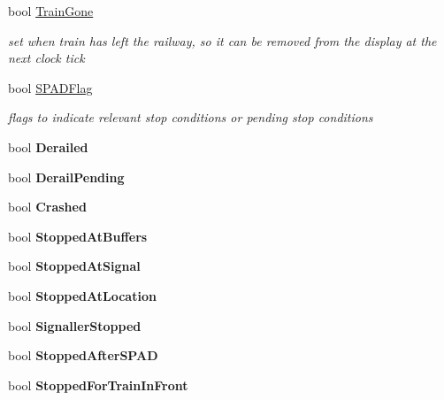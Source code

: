 \begin{DoxyCompactItemize}
bool \mbox{\hyperlink{class_t_train_a3ecf54f0385bc6157ebe5f56512caf1f}{Train\+Gone}}
\begin{DoxyCompactList}\small\item\em set when train has left the railway, so it can be removed from the display at the next clock tick \end{DoxyCompactList}\item 
bool \mbox{\hyperlink{class_t_train_a05383ce005a22df0cb70df7f31a917cf}{S\+P\+A\+D\+Flag}}
\begin{DoxyCompactList}\small\item\em flags to indicate relevant stop conditions or pending stop conditions \end{DoxyCompactList}\item 
\mbox{\label{class_t_train_aa7881a1af2b9f5e899ce02937325c3a3}} 
bool {\bfseries Derailed}
\item 
\mbox{\label{class_t_train_aabb977acb12c9cd6cd527faed9637830}} 
bool {\bfseries Derail\+Pending}
\item 
\mbox{\label{class_t_train_acee5980b53db6ad43e7b5225ad354457}} 
bool {\bfseries Crashed}
\item 
\mbox{\label{class_t_train_a9a549bcd3e8c0d24701399349bc3acc9}} 
bool {\bfseries Stopped\+At\+Buffers}
\item 
\mbox{\label{class_t_train_a444b07eb854c9af80adce5afbb207307}} 
bool {\bfseries Stopped\+At\+Signal}
\item 
\mbox{\label{class_t_train_a89642a602f382d5b58a7f5c0473f786f}} 
bool {\bfseries Stopped\+At\+Location}
\item 
\mbox{\label{class_t_train_ab04bbcf731ecc52b6549604d87101f63}} 
bool {\bfseries Signaller\+Stopped}
\item 
\mbox{\label{class_t_train_a9a333bca3d60db7670500574467ad7da}} 
bool {\bfseries Stopped\+After\+S\+P\+AD}
\item 
\mbox{\label{class_t_train_ae76e8f47258c0915f7f81e3b6596453c}} 
bool {\bfseries Stopped\+For\+Train\+In\+Front}

\end{DoxyCompactItemize}
